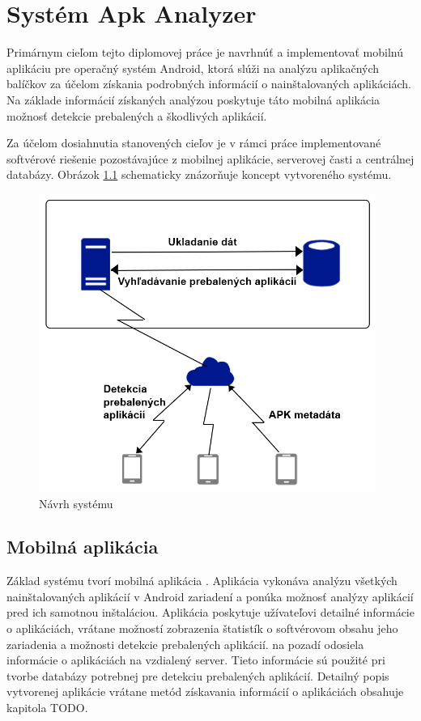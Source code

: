 \chapter{Systém Apk Analyzer}
Primárnym cieľom tejto diplomovej práce je navrhnúť a implementovať mobilnú aplikáciu pre operačný systém Android, ktorá slúži na analýzu aplikačných balíčkov za účelom získania podrobných informácií o nainštalovaných aplikáciách. Na základe informácií získaných analýzou poskytuje táto mobilná aplikácia možnosť detekcie prebalených a škodlivých aplikácií. 

Za účelom dosiahnutia stanovených cieľov je v rámci práce implementované softvérové riešenie pozostávajúce z mobilnej aplikácie, serverovej časti a centrálnej databázy. Obrázok \ref{fig:systémApkAnalyzer} schematicky znázorňuje koncept vytvoreného systému.

\begin{figure}[htb]
  \begin{center}
    \includegraphics[width=110mm]{images/system-overview.png}
  \end{center}
  \caption{Návrh systému }
  \label{fig:systémApkAnalyzer}
\end{figure}

\section{Mobilná aplikácia}
Základ systému tvorí mobilná aplikácia . Aplikácia vykonáva analýzu všetkých nainštalovaných aplikácií v Android zariadení a ponúka možnosť analýzy aplikácií pred ich samotnou inštaláciou. Aplikácia poskytuje užívateľovi detailné informácie o aplikáciách, vrátane možností zobrazenia štatistík o softvérovom obsahu jeho zariadenia a možnosti detekcie prebalených aplikácií.  na pozadí odosiela informácie o aplikáciách na vzdialený server. Tieto informácie sú použité pri tvorbe databázy potrebnej pre detekciu prebalených aplikácií. Detailný popis vytvorenej aplikácie vrátane metód získavania informácií o aplikáciách obsahuje kapitola TODO.

